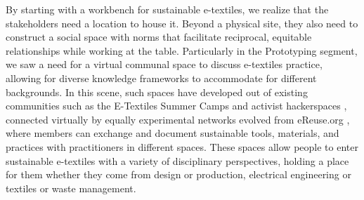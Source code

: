 By starting with a workbench for sustainable e-textiles, we realize that the stakeholders need a location to house it. Beyond a physical site, they also need to construct a social space with norms that facilitate reciprocal, equitable relationships while working at the table.
Particularly in the Prototyping segment, we saw a need for a virtual communal space to discuss e-textiles practice, allowing for diverse knowledge frameworks to accommodate for different backgrounds. In this scene, such spaces have developed out of existing communities such as the E-Textiles Summer Camps \cite{noauthor_httpetextile-summercamporg_nodate} and activist hackerspaces \cite{renno_activism_nodate}, connected virtually by equally experimental networks evolved from eReuse.org \cite{franquesa_circular_2016}, where members can exchange and document sustainable tools, materials, and practices with practitioners in different spaces.
These spaces allow people to enter sustainable e-textiles with a variety of disciplinary perspectives, holding a place for them whether they come from design or production, electrical engineering or textiles or waste management. 


